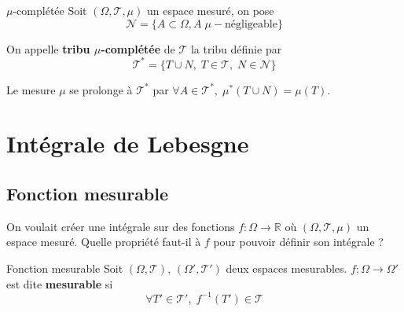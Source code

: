 \begin{Definition}[colbacktitle=red!75!black]{$\mu$-complétée}{}
Soit $(\Omega, \mathcal{T}, \mu)$ un espace mesuré, on pose 
\begin{equation}
  \mathcal{N} = \{A \subset \Omega , A \;\mu-\text{négligeable}\}
\end{equation}



On appelle \textbf{tribu $\mu$-complétée} de $\mathcal{T}$ la tribu définie par 
\begin{equation}
  \boxed{\mathcal{T} ^{*} = \{ T \cup N,\; T \in \mathcal{T}, \; N \in \mathcal{N}\}}
\end{equation}

Le mesure $\mu$ se prolonge à $\mathcal{T} ^{*}$ par $\forall A \in \mathcal{T} ^{*}, \; \mu ^{*}(T \cup N) = \mu(T)$.
\end{Definition}




\newpage

\section{Intégrale de Lebesgne} %

\subsection{Fonction mesurable} %
\label{sub:Fonction mesurable}

\begin{tcolorbox}
    On voulait créer une intégrale sur des fonctions $f: \Omega \to \mathbb{R}$ où $(\Omega, \mathcal{T},\mu)$ un espace mesuré. Quelle propriété faut-il à $f$ pour pouvoir définir son intégrale ?
\end{tcolorbox}

\begin{Definition}[colbacktitle=red!75!black]{Fonction mesurable}{}
Soit $(\Omega, \mathcal{T})$, $(\Omega', \mathcal{T}')$ deux espaces mesurables. 
$f: \Omega \to \Omega'$ est dite \textbf{mesurable} si 
\begin{equation}
  \forall T' \in \mathcal{T} ', \; f ^{-1} (T') \in \mathcal{T}
\end{equation}
\end{Definition}

